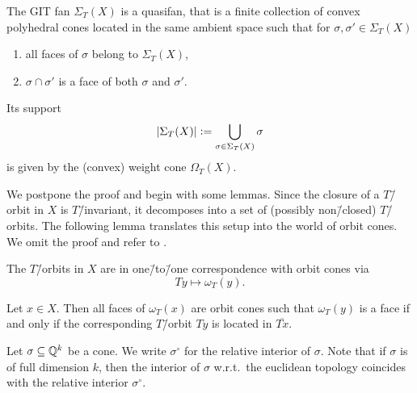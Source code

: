 \begin{theorem}
	\label{theorem:git_fan}
	The GIT fan $\Sigma_T(X)$ is a quasifan, that is a finite collection of convex polyhedral cones located in the same ambient space such that for $\sigma, \sigma'\in \Sigma_T(X)$
	\begin{enumerate}[label={\upshape(\roman*)}]
		\item all faces of $\sigma$ belong to $\Sigma_T(X)$,
		\item $\sigma \cap \sigma'$ is a face of both $\sigma$ and $\sigma'$.
	\end{enumerate}
	Its support
	$$|\Sigma_T(X)| \mathrel{\mathop:}= \bigcup_{\sigma\in\Sigma_T(X)}\sigma$$
	is given by the (convex) weight cone $\Omega_T(X)$.
\end{theorem}

We postpone the proof and begin with some lemmas. Since the closure of a $T$\=/orbit in $X$ is $T$\=/invariant, it decomposes into a set of (possibly non\=/closed) $T$\=/orbits. The following lemma translates this setup into the world of orbit cones. We omit the proof and refer to \cite{git_equivalence}.

\begin{lemma}
	\label{lemma:orbits_correspond_to_orbit_cones}
	The $T$\=/orbits in $X$ are in one\=/to\=/one correspondence with orbit cones via
	$$Ty \mapsto \omega_T(y).$$
	
	Let $x\in X$. Then all faces of $\omega_T(x)$ are orbit cones such that $\omega_T(y)$ is a face if and only if the corresponding $T$\=/orbit $Ty$ is located in $\overline{Tx}$.
\end{lemma}

\begin{notation}
	Let $\sigma\subseteq \mathbb{Q}^k$ be a cone. We write $\sigma^\circ$ for the relative interior of $\sigma$. Note that if $\sigma$ is of full dimension $k$, then the interior of $\sigma$ w.r.t.\ the euclidean topology coincides with the relative interior $\sigma^\circ$.
\end{notation}

